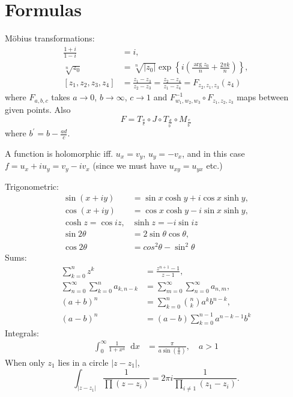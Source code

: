 \documentclass[10pt]{article}
\newcommand\dif{\mathop{}\!\mathrm{d}}
\begin{document}
\section{Formulas}
M\"obius transformations:
\begin{align*}
   \frac{1 + i}
        {1 - i}
&= i, \\
   \sqrt[n]{z_0}
&= \sqrt[n]{|z_0|}
   \exp
   \left\{
     i
     \left(
       \frac{\arg z_0}{n}
     + \frac{2 \pi k}{n}
     \right)
   \right\}, \\
   [z_1, z_2, z_3, z_4]
&= \frac{z_1 - z_3}
        {z_2 - z_3}
 = \frac{z_2 - z_4}
        {z_1 - z_4}
 = F_{z_2, z_1, z_3}(z_4)
\end{align*}
where $F_{a,b,c}$ takes $a \to 0$, $b \to \infty$, $c \to 1$ and
$F_{w_1, w_2, w_3}^{-1} \circ F_{z_1, z_2, z_3}$ maps between given
points. Also
$$
F = T_{\frac{a}{c}} \circ J \circ T_{\frac{d}{b^\prime}} \circ M_{\frac{c}{b^\prime}}
$$
where $b^\prime = b - \frac{ad}{c}$.

A function is holomorphic iff. $u_x = v_y$, $u_y = -v_x$, and in this
case $f = u_x + i u_y = v_y - i v_x$ (since we must have $u_{xy} =
u_{yx}$ etc.)

Trigonometric:
\begin{align*}
   \sin (x + i y)
&= \sin x \cosh y
 + i \cos x \sinh y, \\
   \cos (x + i y)
&= \cos x \cosh y
 - i \sin x \sinh y, \\
  \cosh z = \cos iz,
& \sinh z = -i \sin iz \\
   \sin 2\theta
&= 2\sin \theta \cos \theta, \\
   \cos 2\theta
&= cos^2\theta - \sin^2\theta
\end{align*}
Sums:
\begin{align*}
   \sum_{k=0}^n
     z^k
&= \frac{z^{n+1} - 1}
        {z - 1}, \\
   \sum_{n=0}^\infty
     \sum_{k=0}^n
       a_{k,n-k}
&= \sum_{m=0}^\infty
     \sum_{n=0}^\infty
       a_{n,m}, \\
   (a + b)^n
&= \sum_{k=0}^n
     {n \choose k}
     a^k b^{n-k}, \\
   (a - b)^n
&= (a - b)
   \sum_{k=0}^{n-1}
     a^{n-k-1} b^k
\end{align*}
Integrals:
\begin{align*}
   \int_0^\infty
     \frac{1}{1 + x^a}
     \dif x
&= \frac{\pi}
        {a \sin \left(\frac{\pi}{a}\right)}, \quad a > 1
\end{align*}
When only $z_1$ lies in a circle $|z - z_1|$,
$$
  \int_{|z - z_1|} \frac{1}{\prod (z - z_i)}
= 2 \pi i \frac{1}{\prod_{i \neq 1} (z_1 - z_i)}.
$$
\end{document}
